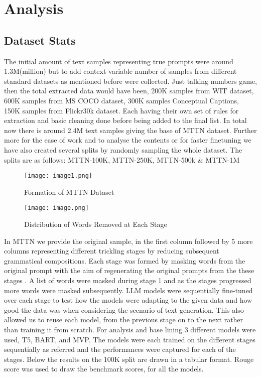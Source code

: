 \documentclass{article}
\begin{document}
\section{Analysis}
\subsection{Dataset Stats}
The initial amount of text samples representing true prompts were around 1.3M(million) but to add context variable number of samples from different standard datasets as mentioned before were collected. Just talking numbers game, then the total extracted data would have been, 200K samples from WIT\cite{srinivasan2021wit} dataset, 600K samples from MS COCO\cite{DBLP:journals/corr/LinMBHPRDZ14} dataset, 300K samples Conceptual Captions\cite{sharma2018conceptual}, 150K samples from Flickr30k\cite{DBLP:journals/corr/PlummerWCCHL15} dataset. Each having their own set of rules for extraction and basic cleaning done before being added to the final list. In total now there is around 2.4M text samples giving the base of MTTN dataset.
Further more for the ease of work and to analyse the contents or for faster finetuning we have also created several splits by randomly sampling the whole dataset. The splits are as follows: MTTN-100K, MTTN-250K, MTTN-500k \& MTTN-1M

\vspace{0.4cm}
\begin{figure}[h!]
\centering
\texttt{[image: image1.png]}
\caption{Formation of MTTN Dataset}
\label{fig: MTTN dataset}
\end{figure}
\vspace{0.3cm}


\vspace{0.4cm}
\begin{figure}[h!]
\centering
\texttt{[image: image.png]}
\caption{Distribution of Words Removed at Each Stage}
\label{fig: Distribution of words removed at each stage}
\end{figure}
\vspace{0.3cm}

In MTTN we provide the original sample, in the first column followed by 5 more columns representing different trickling stages by reducing subsequent grammatical compositions. Each stage was formed  by masking words from the original prompt with the aim of regenerating the original prompts from the these stages . A list of words were masked during stage 1 and as the stages progressed  more words were masked subsequently. LLM models were sequentially fine-tuned over each stage to test how the models were adapting to the given data and how good the data was when considering the scenario of text generation. This also allowed us to reuse each model, from the previous stage on to the next rather than training it from scratch.
For analysis and base lining 3 different models were used, T5\cite{2020t5}, BART\cite{lewis2019bart}, and MVP\cite{tang2022mvp}. The models were each trained on the different stages sequentially as referred and the performances were captured for each of the stages. Below the results on the 100K split are drawn in a tabular format. Rouge score was used to draw the benchmark scores, for all the models.
\end{document}
